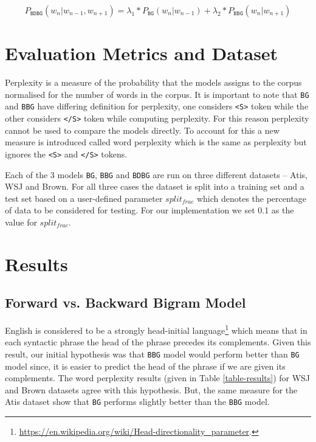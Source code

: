 \documentclass[a4paper]{article}
\newcommand{\code}[1]{\texttt{#1}}
\begin{document}
\begin{equation}
\label{eq1}
P_{\code{BDBG}}(w_n | w_{n-1}, w_{n+1}) = \lambda_1 * P_{\code{BG}}(w_n | w_{n-1}) + \lambda_2 * P_{\code{BBG}}(w_n | w_{n+1})
\end{equation}

\section{Evaluation Metrics and Dataset}
\label{metrics}

Perplexity is a measure of the probability that the models assigns to the corpus normalised for the number of words in the corpus. It is important to note that \code{BG} and \code{BBG} have differing definition for perplexity, one considers \code{<S>} token while the other considers \code{</S>} token while computing perplexity. For this reason perplexity cannot be used to compare the models directly. To account for this a new measure is introduced called word perplexity which is the same as perplexity but ignores the \code{<S>} and \code{</S>} tokens.

Each of the 3 models \code{BG}, \code{BBG} and \code{BDBG} are run on three different datasets -- Atis, WSJ and Brown. For all three cases the dataset is split into a training set and a test set based on a user-defined parameter $split_{frac}$ which denotes the percentage of data to be considered for testing. For our implementation we set 0.1 as the value for $split_{frac}$.

\section{Results}
\label{results}

\subsection{Forward vs. Backward Bigram Model}

English is considered to be a strongly head-initial language\footnote{\url{https://en.wikipedia.org/wiki/Head-directionality_parameter}.} which means that in each syntactic phrase the head of the phrase precedes its complements. Given this result, our initial hypothesis was that \code{BBG} model would perform better than \code{BG} model since, it is easier to predict the head of the phrase if we are given its complements. The word perplexity results (given in Table \ref{table-results}) for WSJ and Brown datasets agree with this hypothesis. But, the same measure for the Atis dataset show that \code{BG} performs slightly better than the \code{BBG} model.
\end{document}
